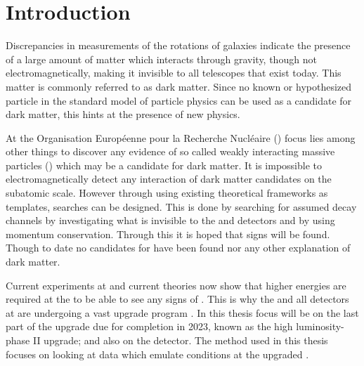 \chapter{Introduction}\label{cha:intro}
Discrepancies in measurements of the rotations of galaxies indicate the presence of a large amount of matter which interacts through gravity, though not electromagnetically, making it invisible to all telescopes that exist today. This matter is commonly referred to as dark matter. Since no known or hypothesized particle in the standard model of particle physics can be used as a candidate for dark matter, this hints at the presence of new physics. 

At the Organisation Européenne pour la Recherche Nucléaire (\abbrCERN) focus lies among other things to discover any evidence of so called weakly interacting massive particles (\abbrWIMPS) which may be a candidate for dark matter. It is impossible to electromagnetically detect any interaction of dark matter candidates on the subatomic scale. However through using existing theoretical frameworks as templates, searches can be designed. This is done by searching for assumed decay channels by investigating what is invisible to the \abbrATLAS and \abbrCMS detectors and by using momentum conservation. Through this it is hoped that signs will be found. Though to date no candidates for \abbrWIMPS have been found nor any other explanation of dark matter. 

Current experiments at \abbrCERN and current theories now show that higher energies are required at the \abbrLHC to be able to see any signs of \abbrWIMPS . This is why the \abbrLHC and all detectors at \abbrCERN are undergoing a vast upgrade program \citep{ATLAS:LOI2}.
In this thesis focus will be on the last part of the upgrade due for completion in 2023, known as the high luminosity-\abbrLHC phase II upgrade; and also on the \abbrATLAS detector. The method used in this thesis focuses on looking at data which emulate conditions at the upgraded \abbrLHC .

\newpage

